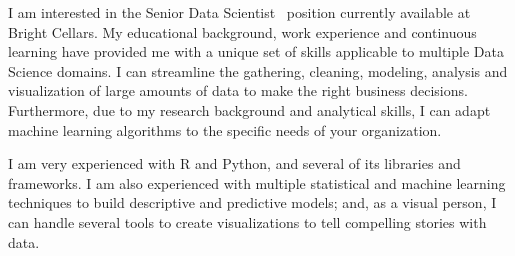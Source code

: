 \documentclass[11pt, letterpaper]{awesome-cv}
\newcommand{\openPosition}{Senior Data Scientist}
\newcommand{\company}{Bright Cellars}
\begin{document}
\makecvheader[R]


\makelettertitle

\begin{cvletter}

I am interested in the \openPosition~ position currently available at \company. My educational background, work experience and continuous learning have provided me with a unique set of skills applicable to multiple Data Science domains. I can streamline the gathering, cleaning, modeling, analysis and visualization of large amounts of data to make the right business decisions. Furthermore, due to my research background and analytical skills, I can adapt machine learning algorithms to the specific needs of your organization.


I am very experienced with R and Python, and several of its libraries and frameworks. I am also experienced with multiple statistical and machine learning techniques to build descriptive and predictive models; and, as a visual person, I can handle several tools to create visualizations to tell compelling stories with data.





\end{cvletter}
\end{document}
